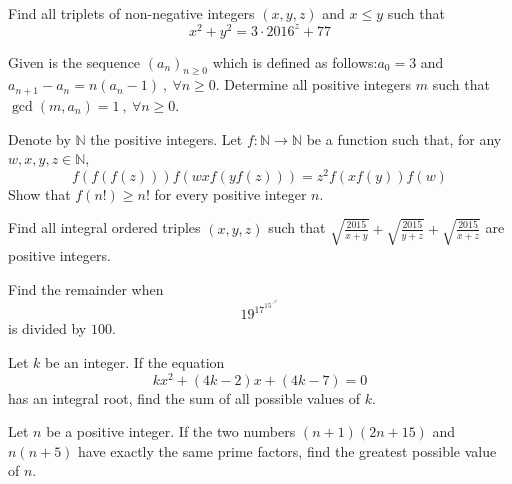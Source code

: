 \documentclass[problems.tex]{subfile}
\begin{document}
	\begin{problem}[Greece 2016]
		Find all triplets of non-negative integers $(x,y,z)$ and $x\leq y$ such that
		$$x^2+y^2=3 \cdot 2016^z+77$$
	\end{problem}

	\begin{problem}
		Given is the sequence $(a_n)_{n\geq 0}$ which is defined as follows:$a_0=3$ and $a_{n+1}-a_n=n(a_n-1) \ , \ \forall n\geq 0$. Determine all positive integers $m$ such that $\gcd (m,a_n)=1 \ , \ \forall n\geq 0$. %
	\end{problem}

	\begin{problem}
		Denote by $\mathbb{N}$ the positive integers. Let $f:\mathbb{N} \rightarrow \mathbb{N}$ be a function such that, for any $w,x,y,z \in \mathbb{N}$, \[ f(f(f(z)))f(wxf(yf(z)))=z^{2}f(xf(y))f(w)\]Show that $f(n!) \ge n!$ for every positive integer $n$. %
	\end{problem}

	\begin{problem}
		Find all integral ordered triples $(x,y,z)$ such that $\displaystyle\sqrt{\frac{2015}{x+y}}+\sqrt{\frac{2015}{y+z}}+\sqrt{\frac{2015}{x+z}}$ are positive integers. %
	\end{problem}

	\begin{problem}
		Find the remainder when $$19^{17^{15^{\iddots^{3^{1}}}}}$$ is divided by $100$.
	\end{problem}

	\begin{problem}
		Let $k$ be an integer. If the equation $$kx^2 + (4k - 2)x + (4k - 7) = 0$$ has an integral root, find the sum of all possible values of $k$.
	\end{problem}

	\begin{problem}
		Let $n$ be a positive integer. If the two numbers $(n + 1)(2n + 15)$ and $n(n + 5)$ have exactly the same prime factors, find the greatest possible value of $n$.
	\end{problem}
\end{document}

